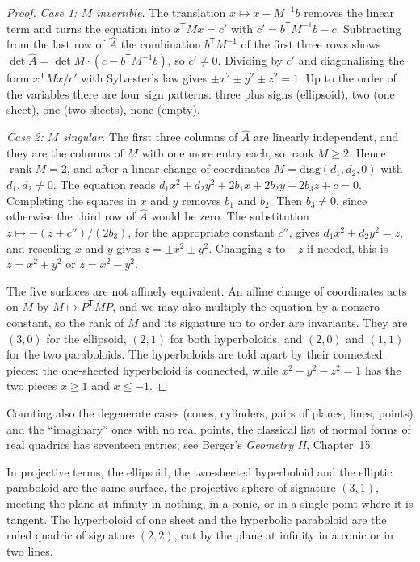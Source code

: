 \begin{proof}
\emph{Case 1: $M$ invertible.} The translation $x\mapsto x-M^{-1}b$ removes the linear term and turns the equation into $x^{\mathsf T}Mx=c'$ with
$c'=b^{\mathsf T}M^{-1}b-c$. Subtracting from the last row of $\hat A$ the combination $b^{\mathsf T}M^{-1}$ of the first three rows shows
$\det\hat A=\det M\cdot(c-b^{\mathsf T}M^{-1}b)$, so $c'\ne0$. Dividing by $c'$ and diagonalising the form $x^{\mathsf T}Mx/c'$ with Sylvester's law gives
$\pm x^2\pm y^2\pm z^2=1$. Up to the order of the variables there are four sign patterns: three plus signs (ellipsoid), two (one sheet), one (two
sheets), none (empty).

\emph{Case 2: $M$ singular.} The first three columns of $\hat A$ are linearly independent, and they are the columns of $M$ with one more entry each,
so $\operatorname{rank}M\ge2$. Hence $\operatorname{rank}M=2$, and after a linear change of coordinates $M=\mathrm{diag}(d_1,d_2,0)$ with $d_1,d_2\ne0$.
The equation reads $d_1x^2+d_2y^2+2b_1x+2b_2y+2b_3z+c=0$. Completing the squares in $x$ and $y$ removes $b_1$ and $b_2$. Then $b_3\ne0$, since otherwise
the third row of $\hat A$ would be zero. The substitution $z\mapsto-(z+c'')/(2b_3)$, for the appropriate constant $c''$, gives $d_1x^2+d_2y^2=z$, and
rescaling $x$ and $y$ gives $z=\pm x^2\pm y^2$. Changing $z$ to $-z$ if needed, this is $z=x^2+y^2$ or $z=x^2-y^2$.

The five surfaces are not affinely equivalent. An affine change of coordinates acts on $M$ by $M\mapsto P^{\mathsf T}MP$, and we may also multiply
the equation by a nonzero constant, so the rank of $M$ and its signature up to order are invariants. They are $(3,0)$ for the ellipsoid, $(2,1)$ for
both hyperboloids, and $(2,0)$ and $(1,1)$ for the two paraboloids. The hyperboloids are told apart by their connected pieces: the one-sheeted
hyperboloid is connected, while $x^2-y^2-z^2=1$ has the two pieces $x\ge1$ and $x\le-1$.
\end{proof}

\begin{remark}
Counting also the degenerate cases (cones, cylinders, pairs of planes, lines, points) and the ``imaginary'' ones with no real points, the classical
list of normal forms of real quadrics has seventeen entries; see Berger's \emph{Geometry II}, Chapter~15.
\end{remark}

In projective terms, the ellipsoid, the two-sheeted hyperboloid and the elliptic paraboloid are the same surface, the projective sphere of
signature $(3,1)$, meeting the plane at infinity in nothing, in a conic, or in a single point where it is tangent. The hyperboloid of one sheet and
the hyperbolic paraboloid are the ruled quadric of signature $(2,2)$, cut by the plane at infinity in a conic or in two lines.

